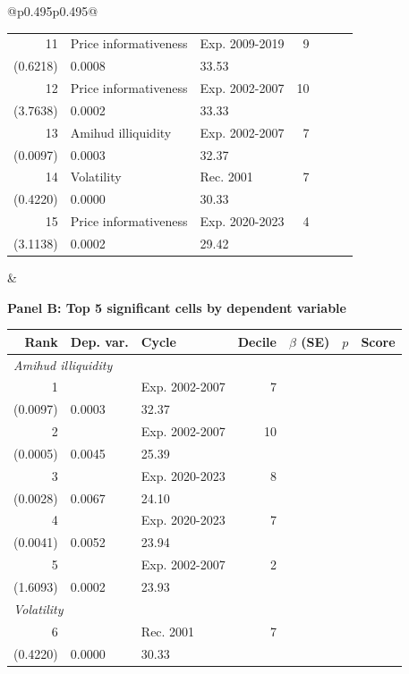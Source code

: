 \begin{table}[!htbp]
\begin{threeparttable}
\begin{tabular}{@{}p{0.495\textwidth}p{0.495\textwidth}@{}}
{\begin{tabular}{@{}rllrccc@{}}
11 & Price informativeness & Exp. 2009-2019 & 9 & \shortstack{-2.0913***\\(0.6218)} & 0.0008 & 33.53 \\
12 & Price informativeness & Exp. 2002-2007 & 10 & \shortstack{-14.0360***\\(3.7638)} & 0.0002 & 33.33 \\
13 & Amihud illiquidity & Exp. 2002-2007 & 7 & \shortstack{0.0348***\\(0.0097)} & 0.0003 & 32.37 \\
14 & Volatility & Rec. 2001 & 7 & \shortstack{-1.8811***\\(0.4220)} & 0.0000 & 30.33 \\
15 & Price informativeness & Exp. 2020-2023 & 4 & \shortstack{-11.7401***\\(3.1138)} & 0.0002 & 29.42 \\
\bottomrule
\end{tabular}
} & \parbox[t]{\linewidth}{
\centering
\textbf{Panel B: Top 5 significant cells by dependent variable}
\par\vspace{0.25em}
\scriptsize
\setlength{\tabcolsep}{2.1pt}
\renewcommand{\arraystretch}{0.95}
\begin{tabular}{@{}rllrccc@{}}
\toprule
Rank & Dep. var. & Cycle & Decile & $\beta$ (SE) & $p$ & Score \\
\midrule
\multicolumn{7}{l}{\textit{Amihud illiquidity}} \\
1 & \multicolumn{1}{l}{} & Exp. 2002-2007 & 7 & \shortstack{0.0348***\\(0.0097)} & 0.0003 & 32.37 \\
2 & \multicolumn{1}{l}{} & Exp. 2002-2007 & 10 & \shortstack{-0.0015***\\(0.0005)} & 0.0045 & 25.39 \\
3 & \multicolumn{1}{l}{} & Exp. 2020-2023 & 8 & \shortstack{-0.0077***\\(0.0028)} & 0.0067 & 24.10 \\
4 & \multicolumn{1}{l}{} & Exp. 2020-2023 & 7 & \shortstack{-0.0115***\\(0.0041)} & 0.0052 & 23.94 \\
5 & \multicolumn{1}{l}{} & Exp. 2002-2007 & 2 & \shortstack{-6.0882***\\(1.6093)} & 0.0002 & 23.93 \\
\multicolumn{7}{l}{\textit{Volatility}} \\
6 & \multicolumn{1}{l}{} & Rec. 2001 & 7 & \shortstack{-1.8811***\\(0.4220)} & 0.0000 & 30.33 \\

\end{tabular}}
\end{tabular}
\end{threeparttable}
\end{table}
